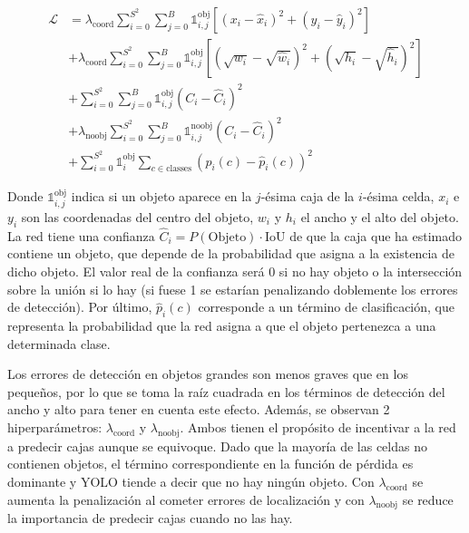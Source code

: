 \documentclass{article}
\begin{document}
	\begin{equation}
	\begin{aligned}
	\mathcal{L} &= \lambda_{\text{coord}} \sum_{i=0}^{S^2} \sum_{j=0}^B \mathds{1}_{i,j}^{\text{obj}} \left[ (x_i - \hat{x}_i)^2 + (y_i - \hat{y}_i)^2 \right] \\
	& + \lambda_{\text{coord}} \sum_{i=0}^{S^2} \sum_{j=0}^B \mathds{1}_{i,j}^{\text{obj}} \left[ \left( \sqrt{w_i} - \sqrt{\hat{w}_i} \right)^2 + \left( \sqrt{h_i} - \sqrt{\hat{h}_i} \right)^2 \right] \\
	& + \sum_{i=0}^{S^2} \sum_{j=0}^B \mathds{1}_{i,j}^{\text{obj}} (C_i - \hat{C}_i)^2 \\
	& + \lambda_{\text{noobj}} \sum_{i=0}^{S^2} \sum_{j=0}^B \mathds{1}_{i,j}^{\text{noobj}} (C_i - \hat{C}_i)^2 \\
	& + \sum_{i=0}^{S^2} \mathds{1}_i^{\text{obj}} \sum_{c \in \text{classes}}(p_i(c) - \hat{p}_i(c))^2
	\end{aligned}
	\end{equation}
	
	Donde $\mathds{1}_{i,j}^{\text{obj}}$ indica si un objeto aparece en la $j$-ésima caja de la $i$-ésima celda, $x_i$ e $y_i$ son las coordenadas del centro del objeto, $w_i$ y $h_i$ el ancho y el alto del objeto. La red tiene una confianza $\hat{C}_i = P(\text{Objeto}) \cdot\text{IoU}$ de que la caja que ha estimado contiene un objeto, que depende de la probabilidad que asigna a la existencia de dicho objeto. El valor real de la confianza será 0 si no hay objeto o la intersección sobre la unión si lo hay (si fuese 1 se estarían penalizando doblemente los errores de detección). Por último, $\hat{p}_i(c)$ corresponde a un término de clasificación, que representa la probabilidad que la red asigna a que el objeto pertenezca a una determinada clase.
		
	Los errores de detección en objetos grandes son menos graves que en los pequeños, por lo que se toma la raíz cuadrada en los términos de detección del ancho y alto para tener en cuenta este efecto. Además, se observan 2 hiperparámetros: $\lambda_{\text{coord}}$ y $\lambda_{\text{noobj}}$. Ambos tienen el propósito de incentivar a la red a predecir cajas aunque se equivoque. Dado que la mayoría de las celdas no contienen objetos, el término correspondiente en la función de pérdida es dominante y YOLO tiende a decir que no hay ningún objeto. Con $\lambda_{\text{coord}}$ se aumenta la penalización al cometer errores de localización y con $\lambda_{\text{noobj}}$ se reduce la importancia de predecir cajas cuando no las hay.
	
\end{document}

